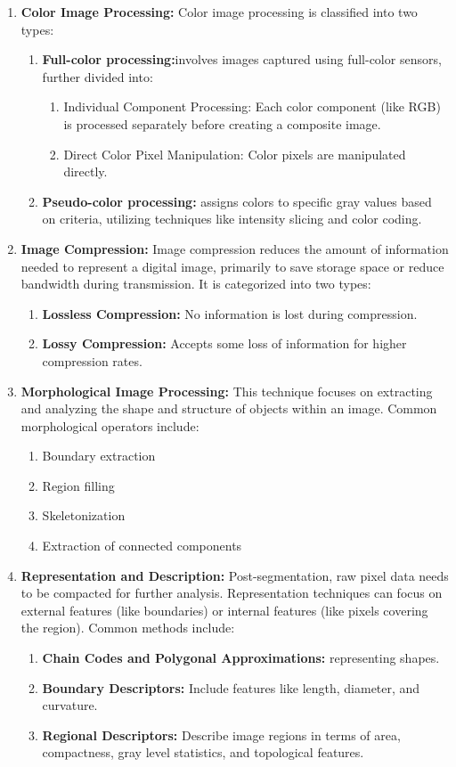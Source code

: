 \documentclass[12pt,oneside,openright,a4paper]{cpe-english-project}
\begin{document}
\begin{enumerate}
	\item \textbf{Color Image Processing:} Color image processing is classified into two types:
	\begin{enumerate}
		\item \textbf{Full-color processing:}involves images captured using full-color sensors, further divided into:
			\begin{enumerate}
			    	\item Individual Component Processing: Each color component (like RGB) is processed separately before creating a composite image.
			    	\item Direct Color Pixel Manipulation: Color pixels are manipulated directly.
			\end{enumerate}
	    	\item \textbf{Pseudo-color processing:} assigns colors to specific gray values based on criteria, utilizing techniques like intensity slicing and color coding.
	\end{enumerate}
	\item \textbf{Image Compression:} Image compression reduces the amount of information needed to represent a digital image, primarily to save storage space or reduce bandwidth during transmission. It is categorized into two types:
	\begin{enumerate}
	    	\item \textbf{Lossless Compression:} No information is lost during compression.
	    	\item \textbf{Lossy Compression:} Accepts some loss of information for higher compression rates.
	\end{enumerate}
	\item \textbf{Morphological Image Processing:} This technique focuses on extracting and analyzing the shape and structure of objects within an image. Common morphological operators include:
	\begin{enumerate}
		\item Boundary extraction
		\item Region filling
		\item Skeletonization
		\item Extraction of connected components
	\end{enumerate}
	\item \textbf{Representation and Description:} Post-segmentation, raw pixel data needs to be compacted for further analysis. Representation techniques can focus on external features (like boundaries) or internal features (like pixels covering the region). Common methods include:
	\begin{enumerate}
		\item \textbf{Chain Codes and Polygonal Approximations:} representing shapes.
		\item \textbf{Boundary Descriptors:} Include features like length, diameter, and curvature.
		\item \textbf{Regional Descriptors:} Describe image regions in terms of area, compactness, gray level statistics, and topological features.
	\end{enumerate}
\end{enumerate}
\end{document}
